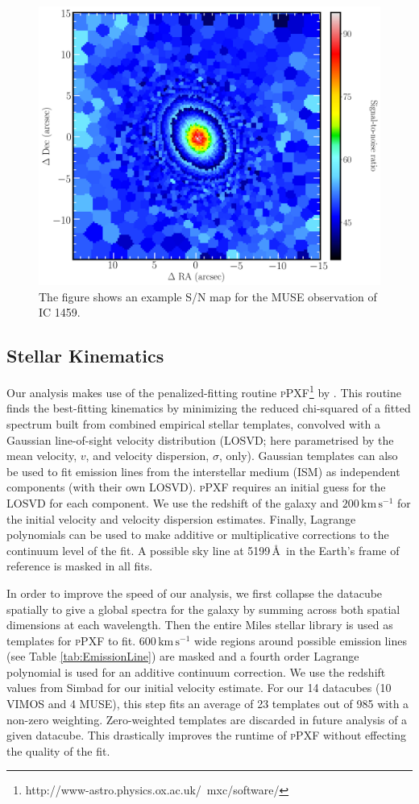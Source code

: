		\begin{figure}
			\centering
			\includegraphics[width=.6\textwidth]{chapter2/egSNR.png}
			\caption[Example S/N map]{The figure shows an example S/N map for the MUSE observation of IC 1459.}
			\label{fig:egSNR}
		\end{figure}

	\subsection{Stellar Kinematics}
		\label{subsec:StellarFit}
		Our analysis makes use of the penalized-fitting routine \textsc{pPXF}\footnote{http://www-astro.physics.ox.ac.uk/~mxc/software/} by \citet{Cappellari2004, Cappellari2016a}. This routine finds the best-fitting kinematics by minimizing the reduced chi-squared of a fitted spectrum built from combined empirical stellar templates, convolved with a Gaussian line-of-sight velocity distribution (LOSVD; here parametrised by the mean velocity, $v$, and velocity dispersion, $\sigma$, only). Gaussian templates can also be used to fit emission lines from the interstellar medium (ISM) as independent components (with their own LOSVD). \textsc{pPXF} requires an initial guess for the LOSVD for each component. We use the redshift of the galaxy and $200\,\mathrm{km\,s^{-1}}$ for the initial velocity and velocity dispersion estimates. Finally, Lagrange polynomials can be used to make additive or multiplicative corrections to the continuum level of the fit. A possible sky line at 5199\,\AA\ in the Earth's frame of reference is masked in all fits.

		In order to improve the speed of our analysis, we first collapse the datacube spatially to give a global spectra for the galaxy by summing across both spatial dimensions at each wavelength. Then the entire Miles stellar library \citep{Sanchez-Blazquez2006, Falcon-Barroso2011a} is used as templates for \textsc{pPXF} to fit. $600\,\mathrm{km\,s^{-1}}$ wide regions around possible emission lines (see Table \ref{tab:EmissionLine}) are masked and a fourth order Lagrange polynomial is used for an additive continuum correction. We use the redshift values from Simbad \citep{Wenger2000} for our initial velocity estimate. For our 14 datacubes (10 VIMOS and 4 MUSE), this step fits an average of 23 templates out of 985 with a non-zero weighting. Zero-weighted templates are discarded in future analysis of a given datacube. This drastically improves the runtime of \textsc{pPXF} without effecting the quality of the fit.


